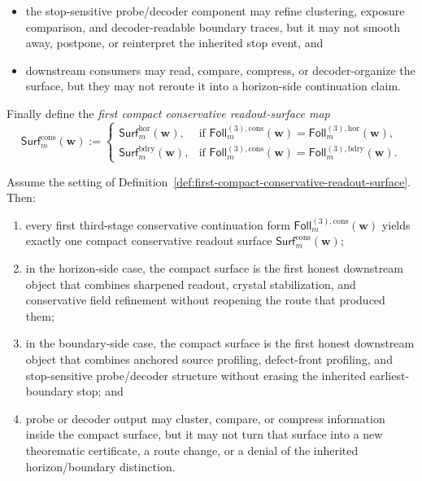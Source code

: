 \begin{definition}
\begin{enumerate}[label=(\roman*)]
\begin{itemize}[leftmargin=2em]
 \item the stop-sensitive probe/decoder component may refine clustering, exposure comparison, and decoder-readable boundary traces, but it may not smooth away, postpone, or reinterpret the inherited stop event, and
 \item downstream consumers may read, compare, compress, or decoder-organize the surface, but they may not reroute it into a horizon-side continuation claim.
 \end{itemize}
\end{enumerate}
Finally define the \emph{first compact conservative readout-surface map}
\[
 \mathsf{Surf}^{\mathrm{cons}}_{m}(\mathbf w)
 :=
 \begin{cases}
 \mathsf{Surf}^{\mathrm{hor}}_{m}(\mathbf w), & \text{if }\mathsf{Foll}^{(3),\mathrm{cons}}_{m}(\mathbf w)=\mathsf{Foll}^{(3),\mathrm{hor}}_{m}(\mathbf w),\\[2mm]
 \mathsf{Surf}^{\mathrm{bdry}}_{m}(\mathbf w), & \text{if }\mathsf{Foll}^{(3),\mathrm{cons}}_{m}(\mathbf w)=\mathsf{Foll}^{(3),\mathrm{bdry}}_{m}(\mathbf w).
 \end{cases}
\]
\end{definition}

\begin{proposition}
\label{prop:every-first-third-stage-conservative-continuation-yields-exactly-one-compact-conservative-readout-surface}
Assume the setting of Definition~\ref{def:first-compact-conservative-readout-surface}. Then:
\begin{enumerate}[label=(\roman*)]
 \item every first third-stage conservative continuation form \(\mathsf{Foll}^{(3),\mathrm{cons}}_{m}(\mathbf w)\) yields exactly one compact conservative readout surface \(\mathsf{Surf}^{\mathrm{cons}}_{m}(\mathbf w)\);
 \item in the horizon-side case, the compact surface is the first honest downstream object that combines sharpened readout, crystal stabilization, and conservative field refinement without reopening the route that produced them;
 \item in the boundary-side case, the compact surface is the first honest downstream object that combines anchored source profiling, defect-front profiling, and stop-sensitive probe/decoder structure without erasing the inherited earliest-boundary stop; and
 \item probe or decoder output may cluster, compare, or compress information inside the compact surface, but it may not turn that surface into a new theorematic certificate, a route change, or a denial of the inherited horizon/boundary distinction.
\end{enumerate}
\end{proposition}

